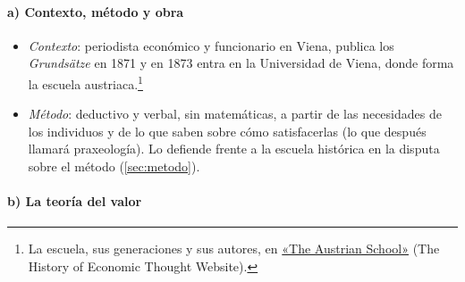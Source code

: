 \documentclass[11pt]{article}
\begin{document}
\paragraph{a) Contexto, método y obra}

\begin{itemize}
\item \emph{Contexto}: periodista económico y funcionario en Viena, publica los \emph{Grundsätze} en 1871 y en 1873 entra en la Universidad de Viena, donde forma la escuela austriaca.\footnote{La escuela, sus generaciones y sus autores, en \href{http://www.hetwebsite.net/het/schools/austrian.htm}{«The Austrian School»} (The History of Economic Thought Website).}
\item \emph{Método}: deductivo y verbal, sin matemáticas, a partir de las necesidades de los individuos y de lo que saben sobre cómo satisfacerlas (lo que después  llamará praxeología). Lo defiende frente a la escuela histórica en la disputa sobre el método (\ref{sec:metodo}).
\end{itemize}

\paragraph{b) La teoría del valor}
\end{document}
